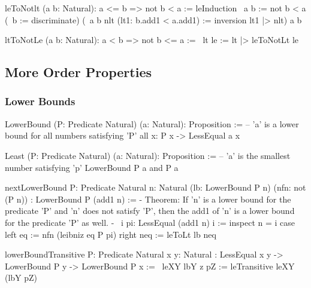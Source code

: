 \begin{alba}
    leToNotlt (a b: Natural): a <= b => not b < a :=
        leInduction
            {\ a b := not b < a}
            (\ b := discriminate)
            (\ a b nlt (lt1: b.add1 < a.add1) :=
                inversion lt1 |> nlt)
            a
            b

    ltToNotLe (a b: Natural): a < b => not b <= a :=
        \ lt le :=
            lt |> leToNotLt le
\end{alba}










\vskip 5mm
\subsection{More Order Properties}

\subsubsection{Lower Bounds}

\begin{alba}
    LowerBound (P: Predicate Natural) (a: Natural): Proposition :=
            -- 'a' is a lower bound for all numbers satisfying 'P'
        all {x}: P x -> LessEqual a x

    Least (P: Predicate Natural) (a: Natural): Proposition :=
            -- 'a' is the smallest number satisfying 'p'
        LowerBound P a and P a


    nextLowerBound
        {P: Predicate Natural}
        {n: Natural}
        (lb: LowerBound P n)
        (nfn: not (P n))
        : LowerBound P (add1 n)
    :=
        {- Theorem: If 'n' is a lower bound for the predicate 'P' and 'n'
           does not satisfy 'P', then the add1 of 'n' is a lower bound
           for the predicate 'P' as well. -}
        \ i pi: LessEqual (add1 n) i :=
            inspect n = i case
                left eq :=
                    nfn (leibniz eq P pi)
                right neq :=
                    leToLt lb neq


    lowerBoundTransitive
        {P: Predicate Natural}
        {x y: Natural}
        : LessEqual x y -> LowerBound P y -> LowerBound P x
    :=
        \ leXY lbY {z} pZ :=
            leTransitive leXY (lbY pZ)
\end{alba}






